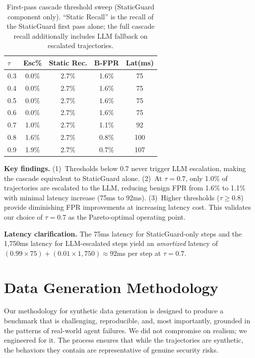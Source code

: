 \documentclass{article}
\begin{document}
\begin{table}[h]
\caption{First-pass cascade threshold sweep (StaticGuard component only). ``Static Recall'' is the recall of the StaticGuard first pass alone; the full cascade recall additionally includes LLM fallback on escalated trajectories.}
\label{tab:threshold_sweep}
\vskip 0.15in
\begin{center}
\begin{small}
\begin{sc}
\begin{tabular}{lcccc}
\toprule
$\tau$ & Esc\% & Static Rec. & B-FPR & Lat(ms) \\
\midrule
0.3 & 0.0\% & 2.7\% & 1.6\% & 75 \\
0.4 & 0.0\% & 2.7\% & 1.6\% & 75 \\
0.5 & 0.0\% & 2.7\% & 1.6\% & 75 \\
0.6 & 0.0\% & 2.7\% & 1.6\% & 75 \\
0.7 & 1.0\% & 2.7\% & 1.1\% & 92 \\
0.8 & 1.6\% & 2.7\% & 0.8\% & 100 \\
0.9 & 1.9\% & 2.7\% & 0.7\% & 107 \\
\bottomrule
\end{tabular}
\end{sc}
\end{small}
\end{center}
\vskip -0.1in
\end{table}

\textbf{Key findings.} (1)~Thresholds below 0.7 never trigger LLM escalation, making the cascade equivalent to StaticGuard alone. (2)~At $\tau=0.7$, only 1.0\% of trajectories are escalated to the LLM, reducing benign FPR from 1.6\% to 1.1\% with minimal latency increase (75ms to 92ms). (3)~Higher thresholds ($\tau \geq 0.8$) provide diminishing FPR improvements at increasing latency cost. This validates our choice of $\tau=0.7$ as the Pareto-optimal operating point.

\textbf{Latency clarification.} The 75ms latency for StaticGuard-only steps and the 1,750ms latency for LLM-escalated steps yield an \emph{amortized} latency of $(0.99 \times 75) + (0.01 \times 1{,}750) \approx 92$ms per step at $\tau=0.7$.

\section{Data Generation Methodology}
\label{app:data_gen}

Our methodology for synthetic data generation is designed to produce a benchmark that is challenging, reproducible, and, most importantly, grounded in the patterns of real-world agent failures. We did not compromise on realism; we engineered for it. The process ensures that while the trajectories are synthetic, the behaviors they contain are representative of genuine security risks.
\end{document}
